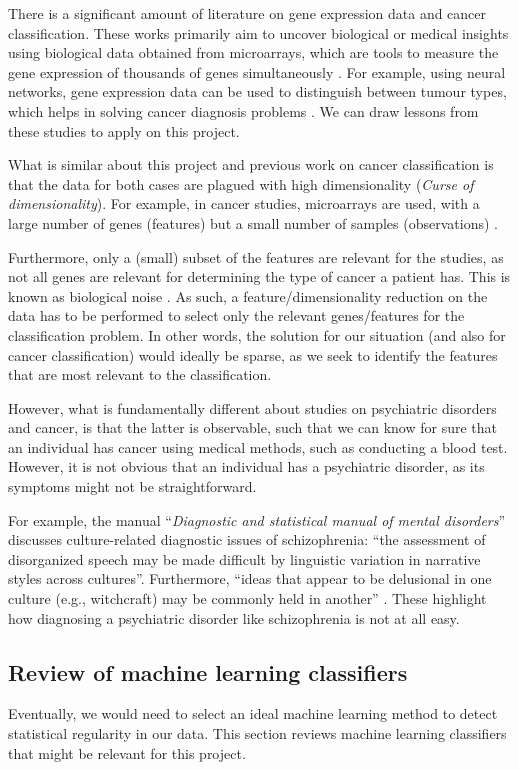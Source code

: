 \documentclass[12pt, twoside, a4paper]{article}
\begin{document}
There is a significant amount of literature on gene expression data and cancer classification. These works primarily aim to uncover biological or medical insights using biological data obtained from microarrays, which are tools to measure the gene expression of thousands of genes simultaneously \citep{RefWorks:79}. For example, using neural networks, gene expression data can be used to distinguish between tumour types, which helps in solving cancer diagnosis problems \citep{RefWorks:80, RefWorks:88}. We can draw lessons from these studies to apply on this project.

What is similar about this project and previous work on cancer classification is that the data for both cases are plagued with high dimensionality (\textit{Curse of dimensionality}). For example, in cancer studies, microarrays are used, with a large number of genes (features) but a small number of samples (observations) \cite{RefWorks:88}.

Furthermore, only a (small) subset of the features are relevant for the studies, as not all genes are relevant for determining the type of cancer a patient has. This is known as biological noise \cite{RefWorks:89}. As such, a feature/dimensionality reduction on the data has to be performed to select only the relevant genes/features for the classification problem. In other words, the solution for our situation (and also for cancer classification) would ideally be sparse, as we seek to identify the features that are most relevant to the classification.

However, what is fundamentally different about studies on psychiatric disorders and cancer, is that the latter is observable, such that we can know for sure that an individual has cancer using medical methods, such as conducting a blood test. However, it is not obvious that an individual has a psychiatric disorder, as its symptoms might not be straightforward.

For example, the manual ``\textit{Diagnostic and statistical manual of mental disorders}'' discusses culture-related diagnostic issues of schizophrenia: ``the assessment of disorganized speech may be made difficult by linguistic variation in narrative styles across cultures''. Furthermore, ``ideas that appear to be delusional in one culture (e.g., witchcraft) may be commonly held in another'' \cite{RefWorks:114}. These highlight how diagnosing a psychiatric disorder like schizophrenia is not at all easy.

\subsection{Review of machine learning classifiers} \label{bg_ML}
Eventually, we would need to select an ideal machine learning method to detect statistical regularity in our data. This section reviews machine learning classifiers that might be relevant for this project.
\end{document}
